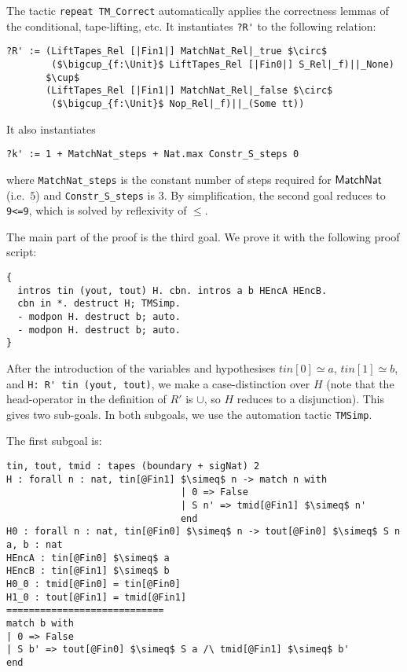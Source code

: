 The tactic \lstinline!repeat TM_Correct! automatically applies the correctness lemmas of the conditional, tape-lifting, etc.  It instantiates
\lstinline!?R'! to the following relation:
\begin{lstlisting}
?R' := (LiftTapes_Rel [|Fin1|] MatchNat_Rel|_true $\circ$
        ($\bigcup_{f:\Unit}$ LiftTapes_Rel [|Fin0|] S_Rel|_f)||_None)
       $\cup$
       (LiftTapes_Rel [|Fin1|] MatchNat_Rel|_false $\circ$
        ($\bigcup_{f:\Unit}$ Nop_Rel|_f)||_(Some tt))
\end{lstlisting}
It also instantiates
\begin{lstlisting}
?k' := 1 + MatchNat_steps + Nat.max Constr_S_steps 0
\end{lstlisting}
where \lstinline!MatchNat_steps! is the constant number of steps required for $\mathsf{MatchNat}$ (i.e.\ $5$) and \lstinline!Constr_S_steps! is $3$.  By
simplification, the second goal reduces to \lstinline!9<=9!, which is solved by reflexivity of $\leq$.

The main part of the proof is the third goal.  We prove it with the following proof script:
\begin{lstlisting}
{
  intros tin (yout, tout) H. cbn. intros a b HEncA HEncB.
  cbn in *. destruct H; TMSimp.
  - modpon H. destruct b; auto.
  - modpon H. destruct b; auto.
}
\end{lstlisting}

After the introduction of the variables and hypothesises $tin[0] \simeq a$, $tin[1] \simeq b$, and \lstinline!H: R' tin (yout, tout)!, we make a
case-distinction over $H$ (note that the head-operator in the definition of $R'$ is $\cup$, so $H$ reduces to a disjunction).  This gives two
sub-goals.  In both subgoals, we use the automation tactic \lstinline!TMSimp!.

The first subgoal is:
\begin{lstlisting}
tin, tout, tmid : tapes (boundary + sigNat) 2
H : forall n : nat, tin[@Fin1] $\simeq$ n -> match n with
                               | 0 => False
                               | S n' => tmid[@Fin1] $\simeq$ n'
                               end
H0 : forall n : nat, tin[@Fin0] $\simeq$ n -> tout[@Fin0] $\simeq$ S n
a, b : nat
HEncA : tin[@Fin0] $\simeq$ a
HEncB : tin[@Fin1] $\simeq$ b
H0_0 : tmid[@Fin0] = tin[@Fin0]
H1_0 : tout[@Fin1] = tmid[@Fin1]
============================
match b with
| 0 => False
| S b' => tout[@Fin0] $\simeq$ S a /\ tmid[@Fin1] $\simeq$ b'
end
\end{lstlisting}

